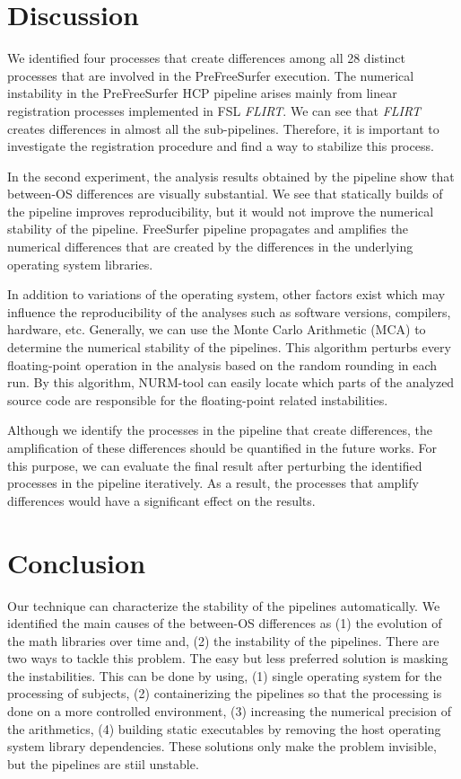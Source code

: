 \documentclass[a4paper,num-refs]{oup-contemporary}
\begin{document}
\section{Discussion}

We identified four processes that create differences 
among all 28 distinct processes that are involved in the PreFreeSurfer execution. 
The numerical instability in the 
PreFreeSurfer HCP pipeline arises mainly from linear 
registration processes implemented in FSL \emph{FLIRT}. 
We can see that \emph{FLIRT} creates differences in almost all the sub-pipelines. 
Therefore, it is important to investigate the registration procedure and find 
a way to stabilize this process. 

In the second experiment, 
the analysis results obtained by the pipeline show that between-OS differences are visually substantial.
We see that statically builds of the pipeline improves reproducibility, but 
it would not improve the numerical stability of the pipeline. 
FreeSurfer pipeline propagates and amplifies the numerical differences that are created by the 
differences in the underlying operating system libraries.

In addition to variations of the operating system, other factors exist which may influence 
the reproducibility of the analyses such as software versions, compilers, hardware, etc.
Generally, we can use the Monte Carlo Arithmetic (MCA) to determine the numerical stability of the pipelines.
This algorithm perturbs every floating-point operation 
in the analysis based on the random rounding in each run. 
By this algorithm, NURM-tool can easily locate which parts of the analyzed source code are responsible 
for the floating-point related instabilities.

Although we identify the processes in the pipeline that create differences, 
the amplification of these differences should be quantified in the future works.
For this purpose, we can evaluate the final result after perturbing the identified 
processes in the pipeline iteratively.
As a result, the processes that amplify differences would have a significant effect on the results.


\section{Conclusion}

Our technique can characterize the stability of the pipelines
automatically. We identified the main causes of the between-OS differences as (1) the evolution 
of the math libraries over time and, (2) the instability of the pipelines. 
There are two ways to tackle this problem. The easy but less preferred solution is masking the instabilities.
This can be done by using, (1) single operating system for the processing of subjects, 
(2) containerizing the pipelines so that the 
processing is done on a more controlled environment, 
(3) increasing the numerical precision of the arithmetics, 
(4) building static executables by removing the host operating system library dependencies. 
These solutions only make the problem invisible, but the pipelines are stiil unstable.
\end{document}

